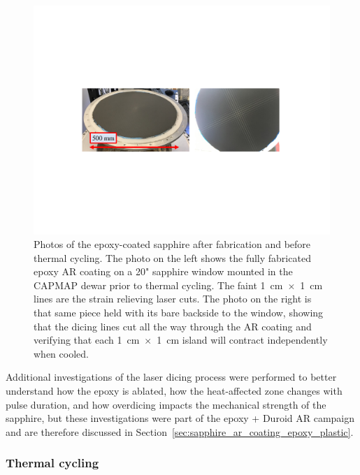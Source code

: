 \begin{figure}[!t]
    \centering
    \includegraphics[width=\linewidth, trim=4cm 8cm 4cm 7.5cm, clip]{ARCoating/Figures/sapphire_epoxy_ar_before_cooling.pdf}
    \caption[Photos of the epoxy-coated sapphire after fabrication and before thermal cycling.]{Photos of the epoxy-coated sapphire after fabrication and before thermal cycling. The photo on the left shows the fully fabricated epoxy AR coating on a 20" sapphire window mounted in the CAPMAP dewar prior to thermal cycling. The faint 1~cm~$\times$~1~cm lines are the strain relieving laser cuts. The photo on the right is that same piece held with its bare backside to the window, showing that the dicing lines cut all the way through the AR coating and verifying that each 1~cm~$\times$~1~cm island will contract independently when cooled.}
    \label{fig:sapphire_epoxy_coated_before_cooling}
\end{figure}

Additional investigations of the laser dicing process were performed to better understand how the epoxy is ablated, how the heat-affected zone changes with pulse duration, and how overdicing impacts the mechanical strength of the sapphire, but these investigations were part of the epoxy + Duroid AR campaign and are therefore discussed in Section~\ref{sec:sapphire_ar_coating_epoxy_plastic}.


\subsubsection{Thermal cycling}
\label{sec:sapphire_ar_coating_epoxy_fabrication_thermal_cycle}

